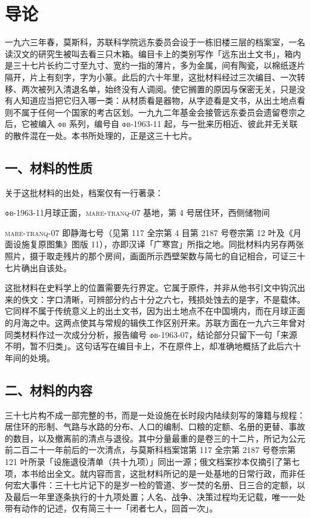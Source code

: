 \chapter*{导\quad 论}

一九六三年春，莫斯科，苏联科学院远东委员会设于一栋旧楼三层的档案室，一名读汉文的研究生被叫去看三只木箱。编目卡上的类别写作「远东出土文书」，箱内是三十七片长约二寸至九寸、宽约一指的薄片，多为金属，间有陶瓷，以棉纸逐片隔开，片上有刻字，字为小篆。此后的六十年里，这批材料经过三次编目、一次转移、两次被列入清退名单，始终没有人调阅。使它搁置的原因与保密无关，只是没有人知道应当把它归入哪一类：从材质看是器物，从字迹看是文书，从出土地点看则不属于任何一个国家的考古区划。一九九二年基金会接管远东委员会遗留卷宗之后，它被编入 \textsc{фв} 系列，编号自 \textsc{фв}-1963-11 起，与一批来历相近、彼此并无关联的散件混在一处。本书所处理的，正是这三十七片。

\section*{一、材料的性质}

关于这批材料的出处，档案仅有一行著录：
\begin{center}
\small\textsc{фв}-1963-11\quad 月球正面，\textsc{mare-tranq-07} 基地，第 4 号居住环，西侧储物间
\end{center}
\textsc{mare-tranq-07} 即静海七号（见第 117 全宗第 4 目第 2187 号卷宗第 12 叶及《月面设施复原图集》图版 11），亦即汉译「广寒宫」所指之地。同批材料内另存两张照片，摄于取走残片的那个房间，画面所示西壁架数与简七的自记相合，可证三十七片确出自该处。

这批材料在史料学上的位置需要先行界定。它属于原件，并非从他书引文中钩沉出来的佚文：字口清晰，可辨部分约占十分之六七，残损处蚀去的是字，不是载体。它同样不属于传统意义上的出土文书，因为出土地点不在中国境内，而在月球正面的月海之中。这两点使其与常规的辑佚工作区别开来。苏联方面在一九六三年曾对同类材料作过一次成分分析，报告编号 \textsc{фв}-1963-07，结论部分只留下一句「来源不明，暂不归类」。这句话写在编目卡上，不在原件上，却准确地概括了此后六十年间的处境。

\section*{二、材料的内容}

三十七片构不成一部完整的书，而是一处设施在长时段内陆续刻写的簿籍与规程：居住环的形制、气路与水路的分布、人口的编制、口粮的定额、名册的更替、事故的数目，以及撤离前的清点与退役。其中分量最重的是卷三的十二片，所记为公元前二百二十一年前后的一次清点，与莫斯科档案馆第 117 全宗第 2187 号卷宗第 121 叶所录「设施退役清单（共十九项）」同出一源；俄文档案抄本仅摘引了第七项，本书给出全文。就内容而言，这批材料所记的是一处基地的日常行政，而非任何宏大事件：三十七片记下的是岁一检的管道、岁一焚的名册、日三合的定额，以及最后一年里逐条执行的十九项处置；人名、战争、决策过程均无记载，唯一一处带有动作的记述，仅有简三十一「闭者七人，回首一次」。

